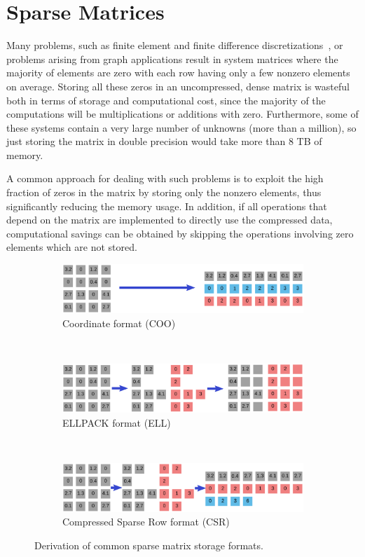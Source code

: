 \section{Sparse Matrices}
\label{introduction:sec:sparse}

Many problems, such as finite element and finite difference
discretizations~\cite{saad,duff}, or problems arising from graph applications
result in system matrices where the majority of elements are zero with
each row having only a few nonzero elements on average. Storing all these zeros
in an uncompressed, dense matrix is wasteful both in terms of storage and
computational cost, since the majority of the computations will be
multiplications or additions with zero. Furthermore, some of these systems
contain a very large number of unknowns (more than a million), so just storing
the matrix in double precision would take more than 8 TB of memory.

A common approach for dealing with such problems is to exploit the high fraction
of zeros in the matrix by storing only the nonzero elements, thus significantly
reducing the memory usage. In addition, if all operations that depend on the
matrix are implemented to directly use the compressed data, computational
savings can be obtained by skipping the operations involving zero elements
which are not stored.

\begin{figure}
\begin{subfigure}{\columnwidth}
\includegraphics[width=\columnwidth]{plots/coo}
\caption{Coordinate format (COO)}
\end{subfigure} \\[2em]
\begin{subfigure}{\columnwidth}
\includegraphics[width=\columnwidth]{plots/ell}
\caption{ELLPACK format (ELL)}
\end{subfigure} \\[2em]
\begin{subfigure}{\columnwidth}
\includegraphics[width=\columnwidth]{plots/csr}
\caption{Compressed Sparse Row format (CSR)}
\end{subfigure}
\caption{Derivation of common sparse matrix storage formats.}
\label{introduction:fig:sparse-formats}
\end{figure}

